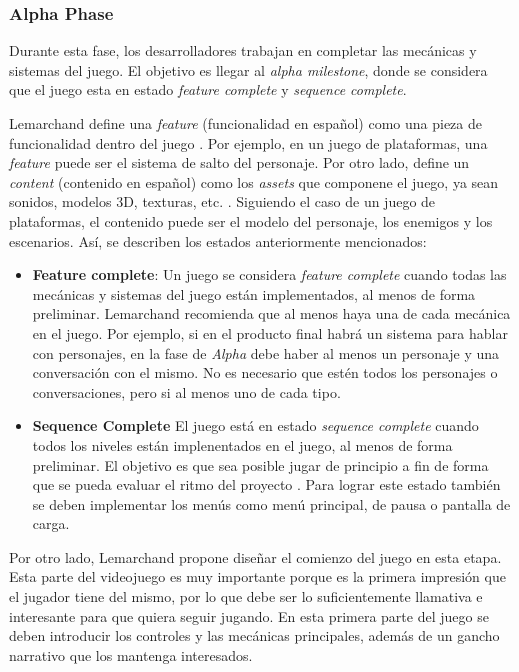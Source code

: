 \subsubsection{Alpha Phase}
\par Durante esta fase, los desarrolladores trabajan en completar las mecánicas y sistemas del juego. El objetivo es llegar al \textit{alpha milestone}, donde se considera que el juego esta en estado \textit{feature complete} y \textit{sequence complete}.
\par Lemarchand define una \textit{feature} (funcionalidad en español) como una pieza de funcionalidad dentro del juego \cite{lemarchandPlayfulProductionProcess2021}. Por ejemplo, en un juego de plataformas, una \textit{feature} puede ser el sistema de salto del personaje. Por otro lado, define un \textit{content} (contenido en español) como los \textit{assets} que componene el juego, ya sean sonidos, modelos 3D, texturas, etc. \cite{lemarchandPlayfulProductionProcess2021}. Siguiendo el caso de un juego de plataformas, el contenido puede ser el modelo del personaje, los enemigos y los escenarios. Así, se describen los estados anteriormente mencionados:
\begin{itemize}
    \item \textbf{Feature complete}: Un juego se considera \textit{feature complete} cuando todas las mecánicas y sistemas del juego están implementados, al menos de forma preliminar. Lemarchand recomienda que al menos haya una de cada mecánica en el juego. Por ejemplo, si en el producto final habrá un sistema para hablar con personajes, en la fase de \textit{Alpha} debe haber al menos un personaje y una conversación con el mismo. No es necesario que estén todos los personajes o conversaciones, pero si al menos uno de cada tipo.
    \item \textbf{Sequence Complete} El juego está en estado \textit{sequence complete} cuando todos los niveles están implenentados en el juego, al menos de forma preliminar. El objetivo es que sea posible jugar de principio a fin de forma que se pueda evaluar el ritmo del proyecto \cite{lemarchandPlayfulProductionProcess2021}. Para lograr este estado también se deben implementar los menús como menú principal, de pausa o pantalla de carga.
\end{itemize}
\par Por otro lado, Lemarchand propone diseñar el comienzo del juego en esta etapa. Esta parte del videojuego es muy importante porque es la primera impresión que el jugador tiene del mismo, por lo que debe ser lo suficientemente llamativa e interesante para que quiera seguir jugando. En esta primera parte del juego se deben introducir los controles y las mecánicas principales, además de un gancho narrativo que los mantenga interesados.
